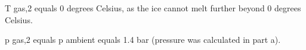 T gas,2 equals 0 degrees Celsius, as the ice cannot melt further beyond 0 degrees Celsius.  

p gas,2 equals p ambient equals 1.4 bar (pressure was calculated in part a).
